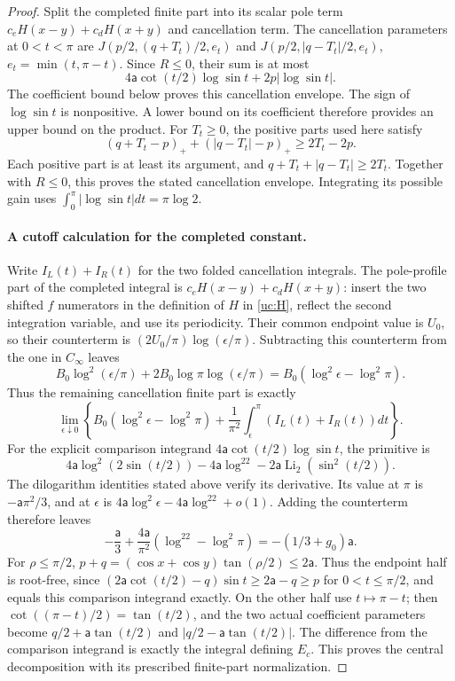 \begin{proof}
Split the completed finite part into its scalar pole term
$c_eH(x-y)+c_dH(x+y)$ and cancellation term. The cancellation
parameters at $0<t<\pi$ are
$J(p/2,(q+T_t)/2,e_t)$ and
$J(p/2,|q-T_t|/2,e_t)$, $e_t=\min(t,\pi-t)$.
Since $R\leq0$, their sum is at most
\[
 4\mathsf{a}\cot(t/2)\log\sin t+2p|\log\sin t|.
\]
The coefficient bound below proves this cancellation envelope.
The sign of $\log\sin t$ is nonpositive. A lower bound on its
coefficient therefore provides an upper bound on the product. For
$T_t\geq0$, the positive parts used here satisfy
\[
 (q+T_t-p)_++(|q-T_t|-p)_+\geq2T_t-2p.
\]
Each positive part is at least its argument, and
$q+T_t+|q-T_t|\geq2T_t$. Together with $R\leq0$, this proves the stated
cancellation envelope. Integrating its possible gain uses
$\int_0^\pi|\log\sin t|dt=\pi\log2$.

\paragraph{A cutoff calculation for the completed constant.}
Write $I_L(t)+I_R(t)$ for the two folded cancellation integrals.
The pole-profile part of the completed integral is
$c_eH(x-y)+c_dH(x+y)$: insert the two shifted $f$ numerators in the
definition of $H$ in \eqref{uc:H}, reflect the second integration variable, and use
its periodicity. Their common endpoint value is $U_0$, so their
counterterm is $(2U_0/\pi)\log(\epsilon/\pi)$.
Subtracting this counterterm from the one in $C_\infty$ leaves
\[
 B_0\log^2(\epsilon/\pi)+2B_0\log\pi\log(\epsilon/\pi)
 =B_0(\log^2\epsilon-\log^2\pi).
\]
Thus the remaining cancellation finite part is exactly
\[
 \lim_{\epsilon\downarrow0}
 \left\{B_0(\log^2\epsilon-\log^2\pi)
     +\frac1{\pi^2}\int_\epsilon^\pi(I_L(t)+I_R(t))dt\right\}.
\]
For the explicit comparison integrand
$4\mathsf a\cot(t/2)\log\sin t$, the primitive is
\[
 4\mathsf a\log^2(2\sin(t/2))-4\mathsf a\log^22
             -2\mathsf a\operatorname{Li}_2(\sin^2(t/2)).
\]
The dilogarithm identities stated above verify its derivative.
Its value at $\pi$ is
$-\mathsf{a}\pi^2/3$, and at $\epsilon$ is
$4\mathsf{a}\log^2\epsilon-4\mathsf{a}\log^22+o(1)$. Adding the counterterm
therefore leaves
\[
 -\frac {\mathsf{a}}{3}+\frac{4\mathsf{a}}{\pi^2}(\log^22-\log^2\pi)
 =-(1/3+g_0)\mathsf{a}.
\]
For $\rho\leq\pi/2$,
$p+q=(\cos x+\cos y)\tan(\rho/2)\leq2\mathsf a$.
Thus the endpoint half is root-free, since
$(2\mathsf a\cot(t/2)-q)\sin t\geq2\mathsf a-q\geq p$
for $0<t\leq\pi/2$, and equals this comparison integrand exactly. On the other half use $t\mapsto\pi-t$;
then $\cot((\pi-t)/2)=\tan(t/2)$, and the two actual coefficient
parameters become $q/2+\mathsf{a}\tan(t/2)$ and
$|q/2-\mathsf{a}\tan(t/2)|$. The difference from the comparison integrand
is exactly the integral defining $E_c$. This proves the central
decomposition with its prescribed finite-part normalization.


\end{proof}
